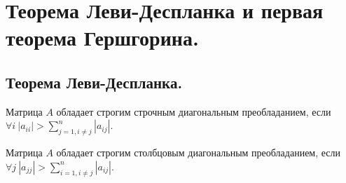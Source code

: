 \section{Теорема Леви-Деспланка и первая теорема Гершгорина.}
\subsection{Теорема Леви-Деспланка.}
\begin{definition*}
    Матрица $A$ обладает строгим строчным диагональным преобладанием, если
    $\displaystyle \forall i \ |a_{ii}| > \sum_{j = 1, i \neq j}^{n} |a_{ij}|$.
\end{definition*}

\begin{definition*}
    Матрица $A$ обладает строгим столбцовым диагональным преобладанием, если
    $\displaystyle \forall j \ |a_{jj}| > \sum_{i = 1, i \neq j}^{n} |a_{ij}|$.
\end{definition*}

